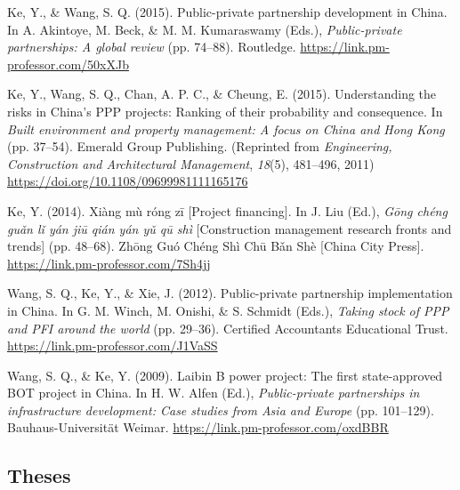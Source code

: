 \documentclass[11pt,a4paper]{report} %
\begin{document}
\begin{tablist}
        \item[2015] \tab{}Ke, Y., \& Wang, S. Q. (2015). Public-private partnership development in China. In A. Akintoye, M. Beck, \& M. M. Kumaraswamy (Eds.), \textit{Public-private partnerships: A global review} (pp. 74--88). Routledge. \href{https://link.pm-professor.com/50xXJb}{https://link.pm-professor.com/50xXJb}

        \item[2015] \tab{}Ke, Y., Wang, S. Q., Chan, A. P. C., \& Cheung, E. (2015). Understanding the risks in China's PPP projects: Ranking of their probability and consequence. In \textit{Built environment and property management: A focus on China and Hong Kong} (pp. 37--54). Emerald Group Publishing. (Reprinted from \textit{Engineering, Construction and Architectural Management}, \textit{18}(5), 481--496, 2011) \href{https://doi.org/10.1108/09699981111165176}{https://doi.org/10.1108/09699981111165176} 
        
        \item[2014] \tab{}Ke, Y. (2014). Xiàng mù róng zī [Project financing]. In J. Liu (Ed.), \textit{Gōng chéng guǎn lǐ yán jiū qián yán yǔ qū shì} [Construction management research fronts and trends] (pp. 48--68). Zhōng Guó Chéng Shì Chū Bǎn Shè [China City Press]. \href{https://link.pm-professor.com/7Sh4jj}{https://link.pm-professor.com/7Sh4jj}
        
        \item[2012] \tab{}Wang, S. Q., Ke, Y., \& Xie, J. (2012). Public-private partnership implementation in China. In G. M. Winch, M. Onishi, \& S. Schmidt (Eds.), \textit{Taking stock of PPP and PFI around the world} (pp. 29--36). Certified Accountants Educational Trust. \href{https://link.pm-professor.com/J1VaSS}{https://link.pm-professor.com/J1VaSS}
        
        \item[2009] \tab{}Wang, S. Q., \& Ke, Y. (2009). Laibin B power project: The first state-approved BOT project in China. In H. W. Alfen (Ed.), \textit{Public-private partnerships in infrastructure development: Case studies from Asia and Europe} (pp. 101--129). Bauhaus-Universität Weimar. \href{https://link.pm-professor.com/oxdBBR}{https://link.pm-professor.com/oxdBBR}

    \end{tablist}

    \subsection*{Theses}
\end{document}
